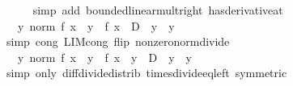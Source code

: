 \begin{isabellebody}
\ \ \ \ \isamarkupfalse%
\ {\isacharparenleft}{\kern0pt}simp\ add{\isacharcolon}{\kern0pt}\ bounded{\isacharunderscore}{\kern0pt}linear{\isacharunderscore}{\kern0pt}mult{\isacharunderscore}{\kern0pt}right\ has{\isacharunderscore}{\kern0pt}derivative{\isacharunderscore}{\kern0pt}at{\isacharparenright}{\kern0pt}\isanewline
\ \ \isamarkupfalse%
\ \isamarkupfalse%
\ {\isachardoublequoteopen}{\isachardot}{\kern0pt}{\isachardot}{\kern0pt}{\isachardot}{\kern0pt}\ {\isacharequal}{\kern0pt}\ {\isacharparenleft}{\kern0pt}{\isasymlambda}y{\isachardot}{\kern0pt}\ norm\ {\isacharparenleft}{\kern0pt}{\isacharparenleft}{\kern0pt}f\ {\isacharparenleft}{\kern0pt}x\ {\isacharplus}{\kern0pt}\ y{\isacharparenright}{\kern0pt}\ {\isacharminus}{\kern0pt}\ f\ x\ {\isacharminus}{\kern0pt}\ D\ {\isacharasterisk}{\kern0pt}\ y{\isacharparenright}{\kern0pt}\ {\isacharslash}{\kern0pt}\ y{\isacharparenright}{\kern0pt}{\isacharparenright}{\kern0pt}\ {\isasymmidarrow}{}{\isasymrightarrow}\ {}{\isachardoublequoteclose}\isanewline
\ \ \ \ \isamarkupfalse%
\ {\isacharparenleft}{\kern0pt}simp\ cong{\isacharcolon}{\kern0pt}\ LIM{\isacharunderscore}{\kern0pt}cong\ flip{\isacharcolon}{\kern0pt}\ nonzero{\isacharunderscore}{\kern0pt}norm{\isacharunderscore}{\kern0pt}divide{\isacharparenright}{\kern0pt}\isanewline
\ \ \isamarkupfalse%
\ \isamarkupfalse%
\ {\isachardoublequoteopen}{\isachardot}{\kern0pt}{\isachardot}{\kern0pt}{\isachardot}{\kern0pt}\ {\isacharequal}{\kern0pt}\ {\isacharparenleft}{\kern0pt}{\isasymlambda}y{\isachardot}{\kern0pt}\ norm\ {\isacharparenleft}{\kern0pt}{\isacharparenleft}{\kern0pt}f\ {\isacharparenleft}{\kern0pt}x\ {\isacharplus}{\kern0pt}\ y{\isacharparenright}{\kern0pt}\ {\isacharminus}{\kern0pt}\ f\ x{\isacharparenright}{\kern0pt}\ {\isacharslash}{\kern0pt}\ y\ {\isacharminus}{\kern0pt}\ D\ {\isacharslash}{\kern0pt}\ y\ {\isacharasterisk}{\kern0pt}\ y{\isacharparenright}{\kern0pt}{\isacharparenright}{\kern0pt}\ {\isasymmidarrow}{}{\isasymrightarrow}\ {}{\isachardoublequoteclose}\isanewline
\ \ \ \ \isamarkupfalse%
\ {\isacharparenleft}{\kern0pt}simp\ only{\isacharcolon}{\kern0pt}\ diff{\isacharunderscore}{\kern0pt}divide{\isacharunderscore}{\kern0pt}distrib\ times{\isacharunderscore}{\kern0pt}divide{\isacharunderscore}{\kern0pt}eq{\isacharunderscore}{\kern0pt}left\ {\isacharbrackleft}{\kern0pt}symmetric{\isacharbrackright}{\kern0pt}{\isacharparenright}{\kern0pt}\isanewline
\ \ \isamarkupfalse%

\end{isabellebody}
